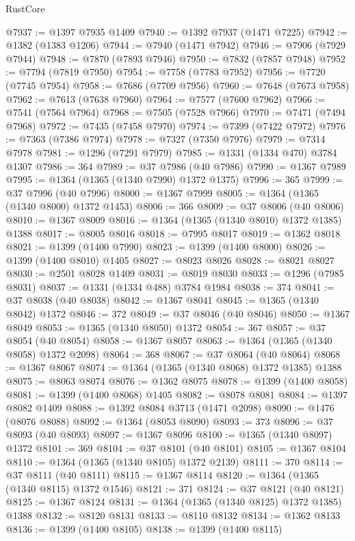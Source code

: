 \begin{lexlean}{RustCore}
\begin{coremodule}
@7937 := @1397 @7935 @1409
@7940 := @1392 @7937 (@1471 @7225)
@7942 := @1382 (@1383 @1206)
@7944 := @7940 (@1471 @7942)
@7946 := @7906 (@7929 @7944)
@7948 := @7870 (@7893 @7946)
@7950 := @7832 (@7857 @7948)
@7952 := @7794 (@7819 @7950)
@7954 := @7758 (@7783 @7952)
@7956 := @7720 (@7745 @7954)
@7958 := @7686 (@7709 @7956)
@7960 := @7648 (@7673 @7958)
@7962 := @7613 (@7638 @7960)
@7964 := @7577 (@7600 @7962)
@7966 := @7541 (@7564 @7964)
@7968 := @7505 (@7528 @7966)
@7970 := @7471 (@7494 @7968)
@7972 := @7435 (@7458 @7970)
@7974 := @7399 (@7422 @7972)
@7976 := @7363 (@7386 @7974)
@7978 := @7327 (@7350 @7976)
@7979 := @7314 @7978
@7981 := @1296 (@7291 @7979)
@7985 := @1331 (@1334 @470) @3784 @1307
@7986 := 364
@7989 := @37 @7986 (@40 @7986)
@7990 := @1367 @7989
@7995 := @1364 (@1365 (@1340 @7990) @1372 @1375)
@7996 := 365
@7999 := @37 @7996 (@40 @7996)
@8000 := @1367 @7999
@8005 := @1364 (@1365 (@1340 @8000) @1372 @1453)
@8006 := 366
@8009 := @37 @8006 (@40 @8006)
@8010 := @1367 @8009
@8016 := @1364 (@1365 (@1340 @8010) @1372 @1385) @1388
@8017 := @8005 @8016
@8018 := @7995 @8017
@8019 := @1362 @8018
@8021 := @1399 (@1400 @7990)
@8023 := @1399 (@1400 @8000)
@8026 := @1399 (@1400 @8010) @1405
@8027 := @8023 @8026
@8028 := @8021 @8027
@8030 := @2501 @8028 @1409
@8031 := @8019 @8030
@8033 := @1296 (@7985 @8031)
@8037 := @1331 (@1334 @488) @3784 @1984
@8038 := 374
@8041 := @37 @8038 (@40 @8038)
@8042 := @1367 @8041
@8045 := @1365 (@1340 @8042) @1372
@8046 := 372
@8049 := @37 @8046 (@40 @8046)
@8050 := @1367 @8049
@8053 := @1365 (@1340 @8050) @1372
@8054 := 367
@8057 := @37 @8054 (@40 @8054)
@8058 := @1367 @8057
@8063 := @1364 (@1365 (@1340 @8058) @1372 @2098)
@8064 := 368
@8067 := @37 @8064 (@40 @8064)
@8068 := @1367 @8067
@8074 := @1364 (@1365 (@1340 @8068) @1372 @1385) @1388
@8075 := @8063 @8074
@8076 := @1362 @8075
@8078 := @1399 (@1400 @8058)
@8081 := @1399 (@1400 @8068) @1405
@8082 := @8078 @8081
@8084 := @1397 @8082 @1409
@8088 := @1392 @8084 @3713 (@1471 @2098)
@8090 := @1476 (@8076 @8088)
@8092 := @1364 (@8053 @8090)
@8093 := 373
@8096 := @37 @8093 (@40 @8093)
@8097 := @1367 @8096
@8100 := @1365 (@1340 @8097) @1372
@8101 := 369
@8104 := @37 @8101 (@40 @8101)
@8105 := @1367 @8104
@8110 := @1364 (@1365 (@1340 @8105) @1372 @2139)
@8111 := 370
@8114 := @37 @8111 (@40 @8111)
@8115 := @1367 @8114
@8120 := @1364 (@1365 (@1340 @8115) @1372 @1546)
@8121 := 371
@8124 := @37 @8121 (@40 @8121)
@8125 := @1367 @8124
@8131 := @1364 (@1365 (@1340 @8125) @1372 @1385) @1388
@8132 := @8120 @8131
@8133 := @8110 @8132
@8134 := @1362 @8133
@8136 := @1399 (@1400 @8105)
@8138 := @1399 (@1400 @8115)

\end{coremodule}
\end{lexlean}
